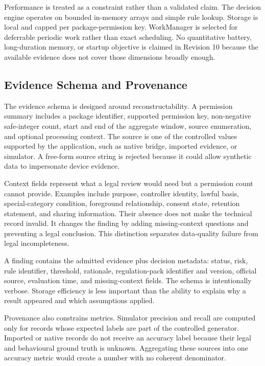 Performance is treated as a constraint rather than a validated claim. The decision engine operates on bounded in-memory arrays and simple rule lookup. Storage is local and capped per package-permission key. WorkManager is selected for deferrable periodic work rather than exact scheduling. No quantitative battery, long-duration memory, or startup objective is claimed in Revision 10 because the available evidence does not cover those dimensions broadly enough.

\subsection{Evidence Schema and Provenance}

The evidence schema is designed around reconstructability. A permission summary includes a package identifier, supported permission key, non-negative safe-integer count, start and end of the aggregate window, source enumeration, and optional processing context. The source is one of the controlled values supported by the application, such as native bridge, imported evidence, or simulator. A free-form source string is rejected because it could allow synthetic data to impersonate device evidence.

Context fields represent what a legal review would need but a permission count cannot provide. Examples include purpose, controller identity, lawful basis, special-category condition, foreground relationship, consent state, retention statement, and sharing information. Their absence does not make the technical record invalid. It changes the finding by adding missing-context questions and preventing a legal conclusion. This distinction separates data-quality failure from legal incompleteness.

A finding contains the admitted evidence plus decision metadata: status, risk, rule identifier, threshold, rationale, regulation-pack identifier and version, official source, evaluation time, and missing-context fields. The schema is intentionally verbose. Storage efficiency is less important than the ability to explain why a result appeared and which assumptions applied.

Provenance also constrains metrics. Simulator precision and recall are computed only for records whose expected labels are part of the controlled generator. Imported or native records do not receive an accuracy label because their legal and behavioural ground truth is unknown. Aggregating these sources into one accuracy metric would create a number with no coherent denominator.

